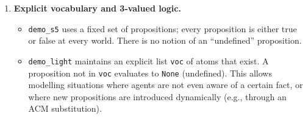 \begin{enumerate}
    \item \textbf{Explicit vocabulary and 3‑valued logic.}
        \begin{itemize}
            \item \texttt{demo\_s5} uses a fixed set of propositions; 
            every proposition is either true or false at every world. 
            There is no notion of an ``undefined'' proposition.
            \item \texttt{demo\_light} maintains an explicit list 
            \texttt{voc} of atoms that exist. A proposition not 
            in \texttt{voc} evaluates to \texttt{None} (undefined). 
            This allows modelling situations where agents are not 
            even aware of a certain fact, or where new propositions 
            are introduced dynamically (e.g., through an ACM substitution).
        \end{itemize}
    

\end{enumerate}

